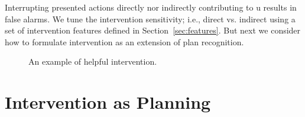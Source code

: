 \documentclass[letterpaper]{article}
\theoremstyle{plain}
\begin{document}
Interrupting presented actions directly nor indirectly contributing to $\mathrm{u}$ results in false alarms.
We tune the intervention sensitivity; i.e., direct vs. indirect using a set of intervention features defined in Section~\ref{sec:features}.
But next we consider how to formulate intervention as an extension of plan recognition.

\begin{figure}[ptb]
         \vspace{0.1mm}
        \caption{An example of helpful intervention.}
        \label{fig:single}
\end{figure}



\section{Intervention as Planning}
\label{sec:intervention}
\end{document}
